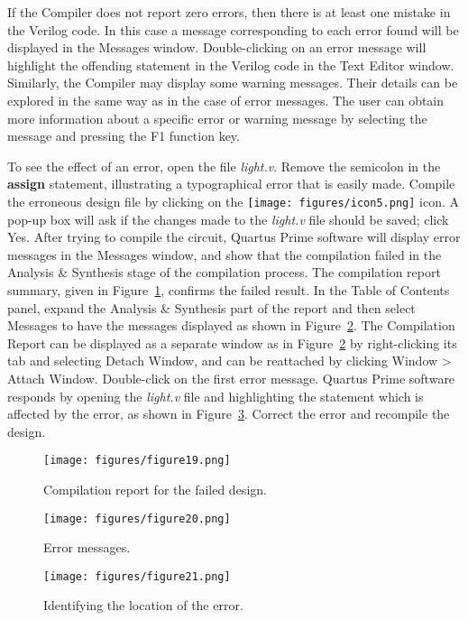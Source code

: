 If the Compiler does not report zero errors, then there is at least one mistake 
in the Verilog code. In this case a
message corresponding to each error found will
be displayed in the Messages window.
Double-clicking on an error message will highlight the offending
statement in the Verilog code in the Text Editor window. 
Similarly, the Compiler may display some warning messages. Their details can be
explored in the same way as in the case of error messages.
The user can obtain more information about a specific error or warning message
by selecting the message and pressing the {\sf F1} function key.

To see the effect of an error, open the file {\it light.v}.
Remove the semicolon in the {\bf assign} statement, illustrating a
typographical error that is easily made.
Compile the erroneous design file by clicking on the \texttt{[image: figures/icon5.png]} icon.
A pop-up box will ask if the changes made to the {\it light.v} file should be saved;
click {\sf Yes}. After trying to compile the circuit,
Quartus Prime software will display error messages in the Messages window, and 
show that the compilation failed in the {\sf Analysis \& Synthesis} stage of the compilation process.
The compilation report summary, given in Figure~\ref{fig:19}, 
confirms the failed result. In the Table of Contents panel, expand the {\sf Analysis \& Synthesis} part of the report
and then select {\sf Messages} to have the messages displayed as shown in Figure~\ref{fig:20}.
The Compilation Report can be displayed as a separate window as in Figure~\ref{fig:20} 
by right-clicking its tab and selecting {\sf Detach Window}, and can be reattached by clicking
{\sf Window > Attach Window}. Double-click on the first error message. 
Quartus Prime software responds by opening the {\it light.v}
file and highlighting the statement which is affected by the error,
as shown in Figure~\ref{fig:21}.
Correct the error and recompile the design.

\begin{figure}[H]
   \begin{center}
      \texttt{[image: figures/figure19.png]}
   \caption{Compilation report for the failed design.} 
	 \label{fig:19}
	 \end{center}
\end{figure}

\begin{figure}[H]
   \begin{center}
      \texttt{[image: figures/figure20.png]}
   \caption{Error messages.}
	 \label{fig:20}
	 \end{center}
\end{figure}

\begin{figure}[H]
   \begin{center}
      \texttt{[image: figures/figure21.png]}
   \caption{Identifying the location of the error.} 
	 \label{fig:21}
	 \end{center}
\end{figure}

